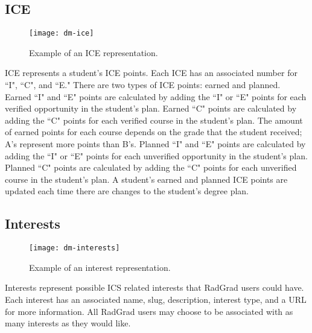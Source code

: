 \subsection{ICE}
\begin{figure}[h]
\centering
\texttt{[image: dm-ice]}
\caption{Example of an ICE representation.}
\end{figure}
ICE represents a student's ICE points. Each ICE has an associated number for ``I", ``C", and ``E." There are two types of ICE points: earned and planned. Earned ``I" and ``E" points are calculated by adding the ``I" or ``E" points for each verified opportunity in the student's plan. Earned ``C" points are calculated by adding the ``C" points for each verified course in the student's plan. The amount of earned points for each course depends on the grade that the student received; A's represent more points than B's. Planned ``I" and ``E" points are calculated by adding the ``I" or ``E" points for each unverified opportunity in the student's plan. Planned ``C" points are calculated by adding the ``C" points for each unverified course in the student's plan. A student's earned and planned ICE points are updated each time there are changes to the student's degree plan. 

\subsection{Interests}
\begin{figure}[h]
\centering
\texttt{[image: dm-interests]}
\caption{Example of an interest representation.}
\end{figure}
Interests represent possible ICS related interests that RadGrad users could have. Each interest has an associated name, slug, description, interest type, and a URL for more information. All RadGrad users may choose to be associated with as many interests as they would like. 

